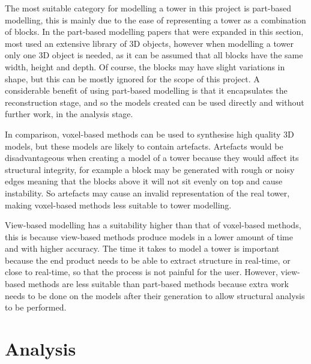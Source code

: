 The most suitable category for modelling a \jenga{} tower in this project is part-based modelling, this is mainly due to the ease of representing a tower as a combination of \jenga{} blocks. In the part-based modelling papers that were expanded in this section, most used an extensive library of 3D objects, however when modelling a \jenga{} tower only one 3D object is needed, as it can be assumed that all blocks have the same width, height and depth. Of course, the blocks may have slight variations in shape, but this can be mostly ignored for the scope of this project. A considerable benefit of using part-based modelling is that it encapsulates the reconstruction stage, and so the models created can be used directly and without further work, in the analysis stage.

In comparison, voxel-based methods can be used to synthesise high quality 3D models, but these models are likely to contain artefacts. Artefacts would be disadvantageous when creating a model of a \jenga{} tower because they would affect its structural integrity, for example a block may be generated with rough or noisy edges meaning that the blocks above it will not sit evenly on top and cause instability. So artefacts may cause an invalid representation of the real tower, making voxel-based methods less suitable to \jenga{} tower modelling.

View-based modelling has a suitability higher than that of voxel-based methods, this is because view-based methods produce models in a lower amount of time and with higher accuracy. The time it takes to model a \jenga{} tower is important because the end product needs to be able to extract structure in real-time, or close to real-time, so that the process is not painful for the user. However, view-based methods are less suitable than part-based methods because extra work needs to be done on the models after their generation to allow structural analysis to be performed.





\section{Analysis}\label{sec:structuralanalysis}

